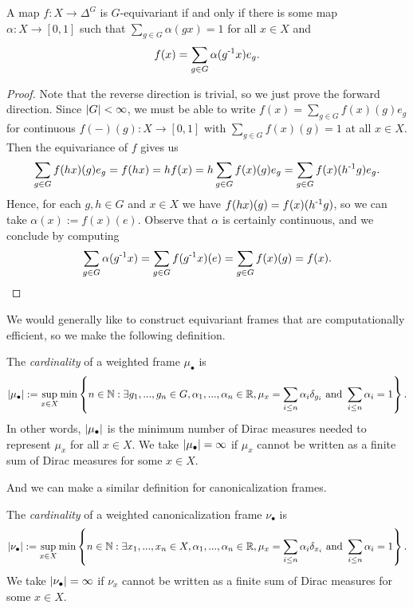 \begin{theorem}\label{thm:equi-map-iff-sum}
    A map $f : X \to \Delta^G$ is $G$-equivariant if and only if there is some map $\alpha : X \to [0,1]$ such that $\sum_{g \in G} \alpha(gx) = 1$ for all $x \in X$ and
    \[
        f(x) = \sum_{g \in G} \alpha(g^{\text{-}1} x) e_g.
    \]
    \begin{proof}
        Note that the reverse direction is trivial, so we just prove the forward direction.
        Since $\left| G \right| < \infty$, we must be able to write $f(x) = \sum_{g \in G} f(x)(g) e_g$ for continuous $f(-)(g) : X \to [0,1]$ with $\sum_{g \in G} f(x)(g) = 1$ at all $x \in X$.
        Then the equivariance of $f$ gives us
        \[
            \sum_{g \in G} f(hx)(g) e_g
            = f(hx)
            = h f(x)
            = h \sum_{g \in G} f(x)(g) e_g
            = \sum_{g \in G} f(x)(h^{\text{-}1}g) e_g.
        \]
        Hence, for each $g,h \in G$ and $x \in X$ we have $f(hx)(g) = f(x)(h^{\text{-}1}g)$, so we can take $\alpha(x) := f(x)(e)$.
        Observe that $\alpha$ is certainly continuous, and we conclude by computing
        \[
            \sum_{g \in G} \alpha(g^{\text{-}1} x)
            = \sum_{g \in G} f(g^{\text{-}1} x)(e)
            = \sum_{g \in G} f(x)(g)
            = f(x).
        \]
    \end{proof}
\end{theorem}


We would generally like to construct equivariant frames that are computationally efficient, so we make the following definition.

\begin{definition}
    The \emph{cardinality} of a weighted frame $\mu_\bullet$ is
    \[
        \left| \mu_\bullet \right| := \sup_{x \in X} \min \left\{ n \in \mathbb{N}: \exists g_1,...,g_n \in G, \alpha_1,...,\alpha_n \in \mathbb{R}, \mu_x = \sum_{i \leq n} \alpha_i \delta_{g_i} \text{ and } \sum_{i \leq n} \alpha_i = 1 \right\}.
    \]
    In other words, $\left| \mu_\bullet \right|$ is the minimum number of Dirac measures needed to represent $\mu_x$ for all $x \in X$.
    We take $\left| \mu_\bullet \right| = \infty$ if $\mu_x$ cannot be written as a finite sum of Dirac measures for some $x \in X$.
\end{definition}

And we can make a similar definition for canonicalization frames.

\begin{definition}
    The \emph{cardinality} of a weighted canonicalization frame $\nu_\bullet$ is
    \[
        \left| \nu_\bullet \right| := \sup_{x \in X} \min \left\{ n \in \mathbb{N}: \exists x_1,...,x_n \in X, \alpha_1,...,\alpha_n \in \mathbb{R}, \mu_x = \sum_{i \leq n} \alpha_i \delta_{x_i} \text{ and } \sum_{i \leq n} \alpha_i = 1 \right\}.
    \]
    We take $\left| \nu_\bullet \right| = \infty$ if $\nu_x$ cannot be written as a finite sum of Dirac measures for some $x \in X$.
\end{definition}


